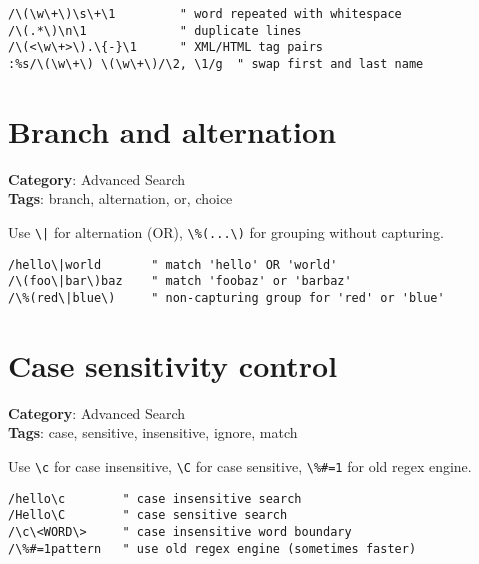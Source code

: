 \begin{Exa*}{}
\begin{Verbatim}[fontsize=\footnotesize, breaklines, breakanywhere]
/\(\w\+\)\s\+\1         " word repeated with whitespace
/\(.*\)\n\1             " duplicate lines
/\(<\w\+>\).\{-}\1      " XML/HTML tag pairs
:%s/\(\w\+\) \(\w\+\)/\2, \1/g  " swap first and last name
\end{Verbatim}
\end{Exa*}

\section{Branch and alternation}

\textbf{Category}: Advanced Search\\ \textbf{Tags}: branch, alternation, or, choice
\vspace{0.5cm}

Use {\footnotesize \Verb§\|§} for alternation (OR), {\footnotesize \Verb§\%(...\)§} for grouping without capturing.

\begin{Exa*}{}
\begin{Verbatim}[fontsize=\footnotesize, breaklines, breakanywhere]
/hello\|world       " match 'hello' OR 'world'
/\(foo\|bar\)baz    " match 'foobaz' or 'barbaz'
/\%(red\|blue\)     " non-capturing group for 'red' or 'blue'
\end{Verbatim}
\end{Exa*}

\section{Case sensitivity control}

\textbf{Category}: Advanced Search\\ \textbf{Tags}: case, sensitive, insensitive, ignore, match
\vspace{0.5cm}

Use {\footnotesize \Verb§\c§} for case insensitive, {\footnotesize \Verb§\C§} for case sensitive, {\footnotesize \Verb§\%#=1§} for old regex engine.

\begin{Exa*}{}
\begin{Verbatim}[fontsize=\footnotesize, breaklines, breakanywhere]
/hello\c        " case insensitive search
/Hello\C        " case sensitive search
/\c\<WORD\>     " case insensitive word boundary
/\%#=1pattern   " use old regex engine (sometimes faster)
\end{Verbatim}
\end{Exa*}

